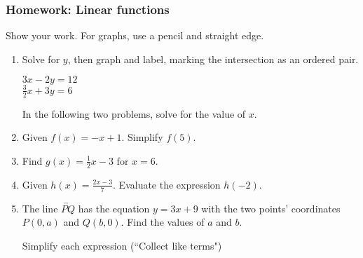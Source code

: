 \documentclass[12pt, twoside]{article}
\begin{document}
\subsubsection*{Homework: Linear functions}
Show your work. For graphs, use a pencil and straight edge.
  \begin{enumerate}

\item Solve for $y$, then graph and label, marking the intersection as an ordered pair.
        \vspace{0.25cm}
        \begin{multicols}{2}
          $3x - 2y =  12$\\
          $\displaystyle \frac{3}{2} x + 3y = 6$
        \end{multicols}
        \vspace{2.25cm}

    \begin{center} %
    \end{center}


    In the following two problems, solve for the value of $x$.

\newpage

\item Given $f(x)=-x+1$. Simplify $f(5)$. \vspace{2cm}
\item Find $g(x)=\frac{1}{2} x-3$ for $x=6$. \vspace{2.5cm}
\item Given $\displaystyle h(x)=\frac{2x-3}{7}$. Evaluate the expression $h(-2)$. \vspace{3cm}

\item The line $\overleftrightarrow{PQ}$ has the equation $y=3x+9$ with the two points' coordinates $P(0,a)$ and $Q(b,0)$. Find the values of $a$ and $b$. \vspace{5cm}

Simplify each expression (``Collect like terms")


\end{enumerate}
\end{document}
